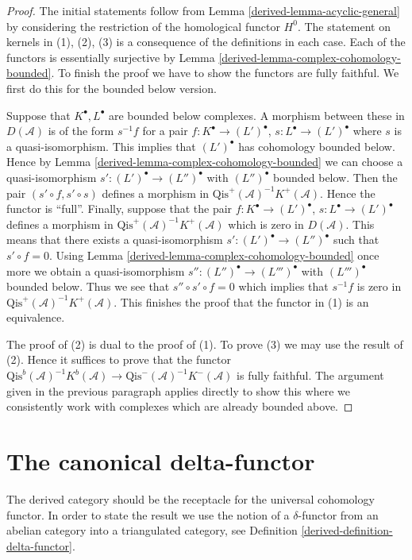 \begin{proof}

The initial statements follow from
Lemma \ref{derived-lemma-acyclic-general}
by considering the restriction of the homological functor $H^0$.
The statement on kernels in (1), (2), (3) is a consequence of the
definitions in each case.
Each of the functors is essentially surjective by
Lemma \ref{derived-lemma-complex-cohomology-bounded}.
To finish the proof we have to show the functors are fully faithful.
We first do this for the bounded below version.

\medskip\noindent
Suppose that $K^\bullet, L^\bullet$ are bounded below complexes.
A morphism between these in $D(\mathcal{A})$ is of the form
$s^{-1}f$ for a pair
$f : K^\bullet \to (L')^\bullet$, $s : L^\bullet \to (L')^\bullet$
where $s$ is a quasi-isomorphism. This implies that $(L')^\bullet$
has cohomology bounded below. Hence by
Lemma \ref{derived-lemma-complex-cohomology-bounded}
we can choose a quasi-isomorphism
$s' : (L')^\bullet \to (L'')^\bullet$
with $(L'')^\bullet$ bounded below. Then the pair $(s' \circ f, s' \circ s)$
defines a morphism in $\text{Qis}^{+}(\mathcal{A})^{-1}K^{+}(\mathcal{A})$.
Hence the functor is ``full''. Finally, suppose that the pair
$f : K^\bullet \to (L')^\bullet$, $s : L^\bullet \to (L')^\bullet$
defines a morphism in $\text{Qis}^{+}(\mathcal{A})^{-1}K^{+}(\mathcal{A})$
which is zero in $D(\mathcal{A})$. This means that there exists a
quasi-isomorphism $s' : (L')^\bullet \to (L'')^\bullet$
such that $s' \circ f = 0$. Using
Lemma \ref{derived-lemma-complex-cohomology-bounded}
once more we obtain a quasi-isomorphism
$s'' : (L'')^\bullet \to (L''')^\bullet$
with $(L''')^\bullet$ bounded below.
Thus we see that $s'' \circ s' \circ f = 0$ which implies that
$s^{-1}f$ is zero in $\text{Qis}^{+}(\mathcal{A})^{-1}K^{+}(\mathcal{A})$.
This finishes the proof that the functor in (1) is an equivalence.

\medskip\noindent
The proof of (2) is dual to the proof of (1).
To prove (3) we may use the result of (2). Hence it suffices to
prove that the functor
$\text{Qis}^b(\mathcal{A})^{-1}K^b(\mathcal{A})
\to \text{Qis}^{-}(\mathcal{A})^{-1}K^{-}(\mathcal{A})$
is fully faithful. The argument given in the previous paragraph
applies directly to show this where we consistently work with complexes
which are already bounded above.
\end{proof}

\section{The canonical delta-functor}
\label{derived-section-canonical-delta-functor}
The derived category should be the receptacle for the universal
cohomology functor. In order to state the result we use
the notion of a $\delta$-functor from an abelian category
into a triangulated category, see
Definition \ref{derived-definition-delta-functor}.

